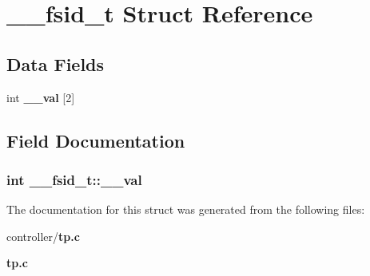 \section{\_\-\_\-fsid\_\-t Struct Reference}
\label{struct____fsid__t}
\subsection*{Data Fields}
\begin{DoxyCompactItemize}
\item 
int {\bf \_\-\_\-val} [2]
\end{DoxyCompactItemize}


\subsection{Field Documentation}
\subsubsection[{\_\-\_\-val}]{\setlength{\rightskip}{0pt plus 5cm}int {\bf \_\-\_\-fsid\_\-t::\_\-\_\-val}}\label{struct____fsid__t_adbefed1af3f4b9a441cd8c2a82088b05}


The documentation for this struct was generated from the following files:\begin{DoxyCompactItemize}
\item 
controller/{\bf tp.c}\item 
{\bf tp.c}\end{DoxyCompactItemize}
